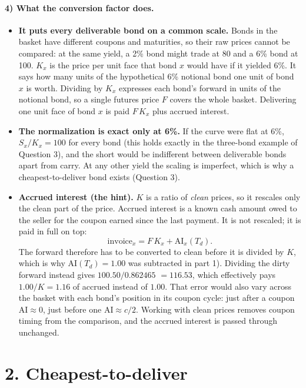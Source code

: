 \documentclass[11pt]{article}
\newcommand{\AI}{\mathrm{AI}}
\begin{document}
\paragraph{4) What the conversion factor does.}
\begin{itemize}[leftmargin=*]
\item \textbf{It puts every deliverable bond on a common scale.} Bonds in the basket have different coupons and maturities, so their raw prices cannot be compared: at the same yield, a 2\% bond might trade at 80 and a 6\% bond at 100. $K_x$ is the price per unit face that bond $x$ would have if it yielded 6\%. It says how many units of the hypothetical 6\% notional bond one unit of bond $x$ is worth. Dividing by $K_x$ expresses each bond's forward in units of the notional bond, so a single futures price $F$ covers the whole basket. Delivering one unit face of bond $x$ is paid $F\,K_x$ plus accrued interest.
\item \textbf{The normalization is exact only at 6\%.} If the curve were flat at 6\%, $S_x/K_x=100$ for every bond (this holds exactly in the three-bond example of Question 3), and the short would be indifferent between deliverable bonds apart from carry. At any other yield the scaling is imperfect, which is why a cheapest-to-deliver bond exists (Question 3).
\item \textbf{Accrued interest (the hint).} $K$ is a ratio of \emph{clean} prices, so it rescales only the clean part of the price. Accrued interest is a known cash amount owed to the seller for the coupon earned since the last payment. It is not rescaled; it is paid in full on top:
\[
\text{invoice}_x=F\,K_x+\AI_x(T_d).
\]
The forward therefore has to be converted to clean before it is divided by $K$, which is why $\AI(T_d)=1.00$ was subtracted in part 1). Dividing the dirty forward instead gives $100.50/0.862465$ $=116.53$, which effectively pays $1.00/K=1.16$ of accrued instead of $1.00$. That error would also vary across the basket with each bond's position in its coupon cycle: just after a coupon $\AI\approx0$, just before one $\AI\approx c/2$. Working with clean prices removes coupon timing from the comparison, and the accrued interest is passed through unchanged.
\end{itemize}

\section*{2. Cheapest-to-deliver}
\end{document}

